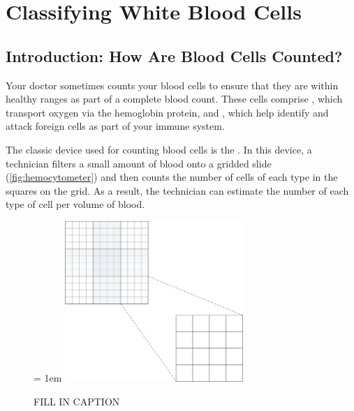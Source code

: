 \chapter[Classifying White Blood Cells]{Classifying White Blood Cells}
\label{chapter:white_blood_cells}
\renewcommand{\chaptertitle}{Classifying White Blood Cells}


\FloatBarrier

\section{Introduction: How Are Blood Cells Counted?}
\label{sec:introduction}

Your doctor sometimes counts your blood cells to ensure that they are within healthy ranges as part of a complete blood count. These cells comprise , which transport oxygen via the hemoglobin protein, and , which help identify and attack foreign cells as part of your immune system.

The classic device used for counting blood cells is the . In this device, a technician filters a small amount of blood onto a gridded slide (\autoref{fig:hemocytometer}) and then counts the number of cells of each type in the squares on the grid. As a result, the technician can estimate the number of each type of cell per volume of blood.\\

\begin{figure}[h]
\centering
\tabcolsep = 1em
\mySfFamily
\includegraphics[width = 0.6\textwidth]{../images/hemocytometer.png}
\caption{FILL IN CAPTION}
\label{fig:hemocytometer}
\end{figure}

